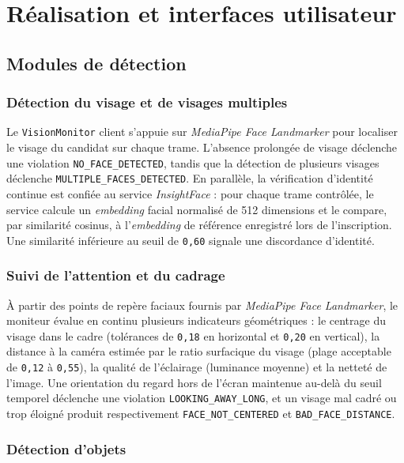 \section{Réalisation et interfaces utilisateur}

\subsection{Modules de détection}

\subsubsection{Détection du visage et de visages multiples}

Le \texttt{VisionMonitor} client s'appuie sur \textit{MediaPipe Face Landmarker} pour
localiser le visage du candidat sur chaque trame. L'absence prolongée de visage déclenche une
violation \texttt{NO\_\allowbreak FACE\_\allowbreak DETECTED}, tandis que la détection de plusieurs visages déclenche
\texttt{MULTIPLE\_\allowbreak FACES\_\allowbreak DETECTED}. En parallèle, la vérification d'identité continue est
confiée au service \textit{InsightFace} : pour chaque trame contrôlée, le service calcule
un \textit{embedding} facial normalisé de 512 dimensions et le compare, par similarité
cosinus, à l'\textit{embedding} de référence enregistré lors de l'inscription. Une similarité
inférieure au seuil de \texttt{0{,}60} signale une discordance d'identité.

\subsubsection{Suivi de l'attention et du cadrage}

À partir des points de repère faciaux fournis par \textit{MediaPipe Face Landmarker}, le
moniteur évalue en continu plusieurs indicateurs géométriques : le centrage du visage dans le
cadre (tolérances de \texttt{0{,}18} en horizontal et \texttt{0{,}20} en vertical), la
distance à la caméra estimée par le ratio surfacique du visage (plage acceptable de
\texttt{0{,}12} à \texttt{0{,}55}), la qualité de l'éclairage (luminance moyenne) et la
netteté de l'image. Une orientation du regard hors de l'écran maintenue au-delà du seuil
temporel déclenche une violation \texttt{LOOKING\_AWAY\_LONG}, et un visage mal cadré ou trop
éloigné produit respectivement \texttt{FACE\_NOT\_CENTERED} et \texttt{BAD\_FACE\_DISTANCE}.

\subsubsection{Détection d'objets}

